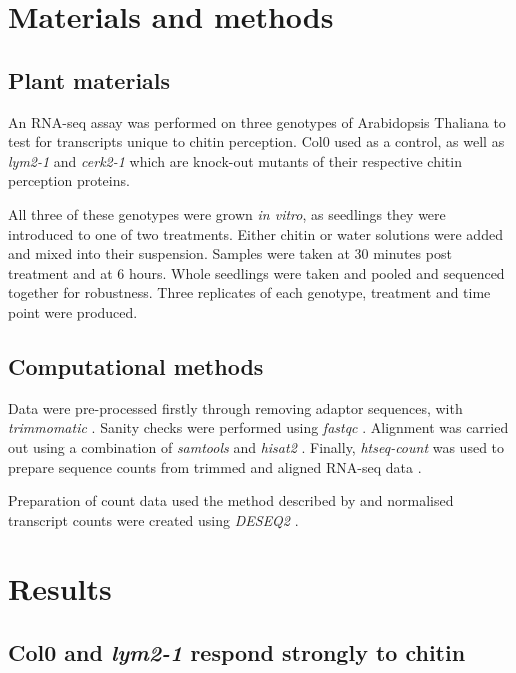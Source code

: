 \documentclass[../main.tex]{subfiles}
\begin{document}
\section{Materials and methods}

\subsection{Plant materials}
An RNA-seq assay was performed on three genotypes of Arabidopsis Thaliana to
test for transcripts unique to chitin perception. Col0 used as a control,
as well as \textit{lym2-1} and \textit{cerk2-1} which are knock-out mutants of
their respective chitin perception proteins. 

All three of these genotypes were grown \textit{in vitro}, as seedlings they
were introduced to one of two treatments. Either chitin or water solutions were
added and mixed into their suspension. Samples were taken at 30 minutes post
treatment and at 6 hours. Whole seedlings were taken and pooled and sequenced
together for robustness. Three replicates of each genotype, treatment and time
point were produced.


\subsection{Computational methods}

Data were pre-processed firstly through removing adaptor sequences, with
\textit{trimmomatic} \cite{bolgerTrimmomaticFlexibleTrimmer2014}. Sanity checks
were performed using \textit{fastqc} \cite{andrewsBabrahamBioinformaticsFastQC}.
Alignment was carried out using a combination of \textit{samtools} and
\textit{hisat2} \cite{liSequenceAlignmentMap2009}. Finally, \textit{htseq-count} was used to prepare sequence
counts from trimmed and aligned RNA-seq data \cite{kimHISATFastSpliced2015}.

Preparation of count data used the method described by
\citet{loveModeratedEstimationFold2014a} and normalised transcript counts were
created using \textit{DESEQ2} \cite{piperCountNormalizationDESeq22017}.

\section{Results}
\label{sec:seqresults}

\subsection{Col0 and \textit{lym2-1} respond strongly to chitin}
\end{document}
